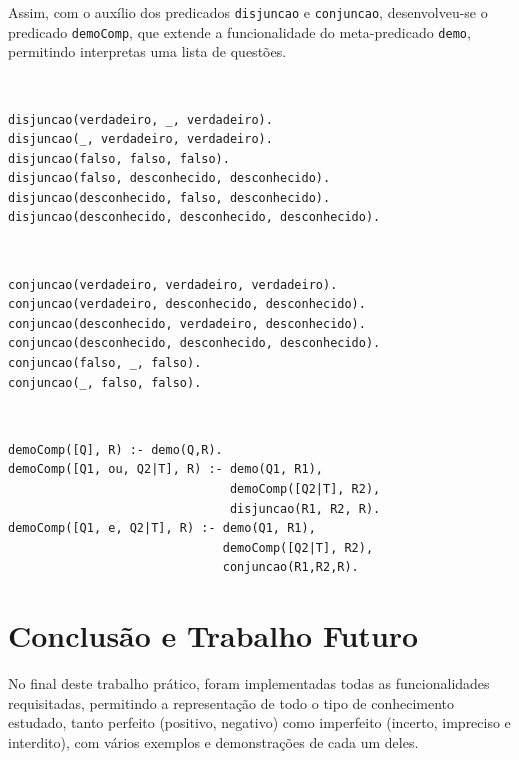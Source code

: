 \documentclass[a4paper, 11pt]{article}
\begin{document}
Assim, com o auxílio dos predicados \texttt{disjuncao} e \texttt{conjuncao}, desenvolveu-se o 
predicado \texttt{demoComp}, que extende a funcionalidade do meta-predicado \texttt{demo}, 
permitindo interpretas uma lista de questões.

\

\begin{lstlisting}[caption={Extensão do predicado \texttt{disjuncao}}]
% Extensao do predicado disjuncao: X, Y, R -> {V, F, D}
disjuncao(verdadeiro, _, verdadeiro).
disjuncao(_, verdadeiro, verdadeiro).
disjuncao(falso, falso, falso).
disjuncao(falso, desconhecido, desconhecido).
disjuncao(desconhecido, falso, desconhecido).
disjuncao(desconhecido, desconhecido, desconhecido).
\end{lstlisting}

\

\begin{lstlisting}[caption={Extensão do predicado \texttt{conjuncao}}]
% Extensao do predicado conjuncao: X, Y, R -> {V, F, D}
conjuncao(verdadeiro, verdadeiro, verdadeiro).
conjuncao(verdadeiro, desconhecido, desconhecido).
conjuncao(desconhecido, verdadeiro, desconhecido).
conjuncao(desconhecido, desconhecido, desconhecido).
conjuncao(falso, _, falso).
conjuncao(_, falso, falso).
\end{lstlisting}

\

\begin{lstlisting}[caption={Extensão do predicado \texttt{demoComp}}]
% Extensao do predicado demoComp: Lista, R -> {V, F, D}
demoComp([Q], R) :- demo(Q,R).
demoComp([Q1, ou, Q2|T], R) :- demo(Q1, R1),
                               demoComp([Q2|T], R2),
                               disjuncao(R1, R2, R).
demoComp([Q1, e, Q2|T], R) :- demo(Q1, R1),
                              demoComp([Q2|T], R2),
                              conjuncao(R1,R2,R).
\end{lstlisting}

\pagebreak

\section{Conclusão e Trabalho Futuro}

No final deste trabalho prático, foram implementadas todas as funcionalidades requisitadas,
permitindo a representação de todo o tipo de conhecimento estudado, tanto perfeito (positivo, 
negativo) como imperfeito (incerto, impreciso e interdito), com vários
exemplos e demonstrações de cada um deles.
\end{document}
